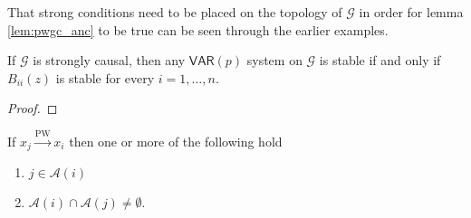 \documentclass[12pt]{article}
\def\pwgc{\overset{\text{PW}}{\rightarrow}}  %
\def\gcg{\mathcal{G}}  %
\def\VAR{\mathsf{VAR}}  %
\newcommand{\pa}[1]{pa(#1)}  %
\newcommand{\anc}[1]{\mathcal{A}(#1)}  %
\begin{document}
That strong conditions need to be placed on the topology of $\gcg$ in
order for lemma \ref{lem:pwgc_anc} to be true can be seen through the
earlier examples.

\begin{lemma}
  If $\gcg$ is strongly causal, then any $\VAR(p)$ system on $\gcg$ is stable if and only if
  $B_{ii}(z)$ is stable for every $i = 1, \ldots, n$.
\end{lemma}
\begin{proof}
\end{proof}






\begin{lemma}
  \label{lem:pwgc_anc}
  If $x_j \pwgc x_i$ then one or more of the following hold

  \begin{enumerate}
    \item{$j \in \anc{i}$}
    \item{$\anc{i}\cap\anc{j} \ne \emptyset$.}
  \end{enumerate}
\end{lemma}

\end{document}

